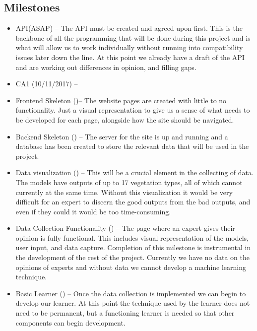 \documentclass{ecmm427_assignment}
\begin{document}
\subsection{Milestones}

\begin{itemize}

\item API(ASAP) – The API must be created and agreed upon first. This is the backbone of all the programming that will be done during this project and is what will allow us to work individually without running into compatibility issues later down the line. At this point we already have a draft of the API and are working out differences in opinion, and filling gaps.

\item CA1 (10/11/2017) – 

\item Frontend Skeleton ()– The website pages are created with little to no functionality. Just a visual representation to give us a sense of what needs to be developed for each page, alongside how the site should be navigated.

\item Backend Skeleton () –  The server for the site is up and running and a database has been created to store the relevant data that will be used in the project. 

\item Data visualization () –  This will be a crucial element in the collecting of data. The models have outputs of up to 17 vegetation types, all of which cannot currently at the same time. Without this visualization it would be very difficult for an expert to discern the good outputs from the bad outputs, and even if they could it would be too time-consuming.

\item Data Collection Functionality () – The page where an expert gives their opinion is fully functional. This includes visual representation of the models, user input, and data capture. Completion of this milestone is instrumental in the development of the rest of the project. Currently we have no data on the opinions of experts and without data we cannot develop a machine learning technique.

\item Basic Learner () – Once the data collection is implemented we can begin to develop our learner. At this point the technique used by the learner does not need to be permanent, but a functioning learner is needed so that other components can begin development.


\end{itemize}
\end{document}
